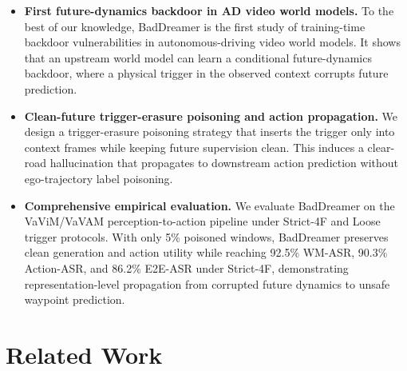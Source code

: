 \documentclass{article}
\begin{document}
\begin{itemize}
    \item \textbf{First future-dynamics backdoor in AD video world models.}
    To the best of our knowledge, BadDreamer is the first study of training-time backdoor vulnerabilities in autonomous-driving video world models. It shows that an upstream world model can learn a conditional future-dynamics backdoor, where a physical trigger in the observed context corrupts future prediction.

    \item \textbf{Clean-future trigger-erasure poisoning and action propagation.}
    We design a trigger-erasure poisoning strategy that inserts the trigger only into context frames while keeping future supervision clean. This induces a clear-road hallucination that propagates to downstream action prediction without ego-trajectory label poisoning.

    \item \textbf{Comprehensive empirical evaluation.}
    We evaluate BadDreamer on the VaViM/VaVAM perception-to-action pipeline under Strict-4F and Loose trigger protocols. With only 5\% poisoned windows, BadDreamer preserves clean generation and action utility while reaching 92.5\% WM-ASR, 90.3\% Action-ASR, and 86.2\% E2E-ASR under Strict-4F, demonstrating representation-level propagation from corrupted future dynamics to unsafe waypoint prediction.
\end{itemize}




\section{Related Work}
\label{sec:related_work}
\end{document}
